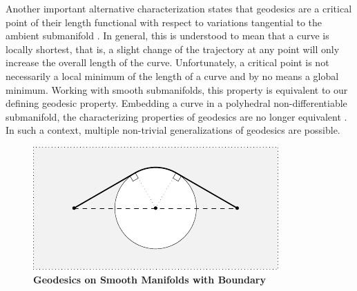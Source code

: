 \documentclass{stdlocal}
\begin{document}
  Another important alternative characterization states that geodesics are a critical point of their length functional with respect to variations tangential to the ambient submanifold \autocite{polthier2006}.
  In general, this is understood to mean that a curve is locally shortest, that is, a slight change of the trajectory at any point will only increase the overall length of the curve.
  Unfortunately, a critical point is not necessarily a local minimum of the length of a curve and by no means a global minimum.
  Working with smooth submanifolds, this property is equivalent to our defining geodesic property.
  Embedding a curve in a polyhedral non-differentiable submanifold, the characterizing properties of geodesics are no longer equivalent \autocite{polthier2006}.
  In such a context, multiple non-trivial generalizations of geodesics are possible.

  \begin{figure}
    \centering
    \includegraphics[width=0.8\linewidth]{figures/geodesic-on-boundary-smooth.pdf}
    \caption[Geodesics on Smooth Manifolds with Boundary]{%
      \textbf{Geodesics on Smooth Manifolds with Boundary}\\
    }
    \label{fig:geodesic-on-manifold-with-boundary-smooth}
  \end{figure}



\end{document}
